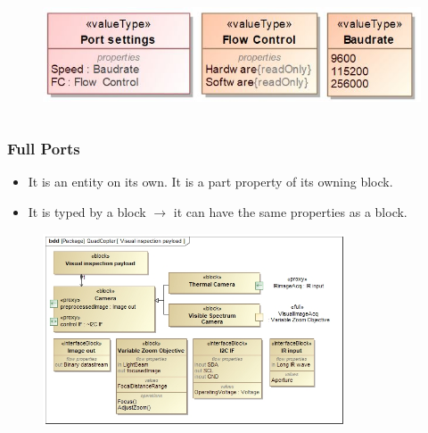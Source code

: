 \documentclass[xcolor=dvipsnames,t]{beamer}
\begin{document}
\begin{frame}
\begin{columns}
\begin{column}{0.5\textwidth}
\begin{figure}
 	\includegraphics[width=\textwidth]{PortInterfaceConfig.jpg}
\end{figure}
\end{column}

\end{columns}
\end{frame}

\begin{frame}
\frametitle{Full Ports}

\begin{itemize}
\item It is an entity on its own. It is a part property of its owning block.
\item It is typed by a block $\longrightarrow$ it can have the same properties as a block.
\end{itemize}


\begin{figure}
 	\includegraphics[width=0.8\textwidth]{VisualInspectionPayload.jpg}
\end{figure}



\end{frame}
\end{document}
